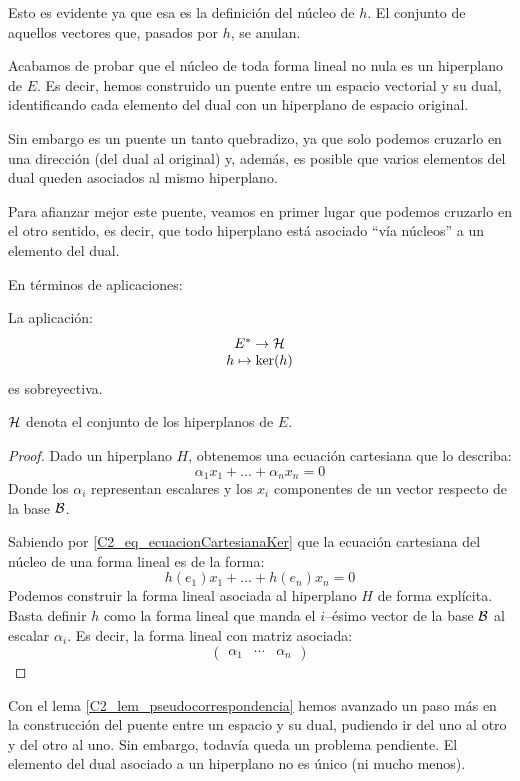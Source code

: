Esto es evidente ya que esa es la definición del núcleo de $h$. El conjunto de aquellos vectores que, pasados por $h$, se anulan.

Acabamos de probar que el núcleo de toda forma lineal no nula es un hiperplano de $E$. Es decir, hemos construido un puente entre un espacio vectorial y su dual, identificando cada elemento del dual con un hiperplano de espacio original.

Sin embargo es un puente un tanto quebradizo, ya que solo podemos cruzarlo en una dirección (del dual al original) y, además, es posible que varios elementos del dual queden asociados al mismo hiperplano.

Para afianzar mejor este puente, veamos en primer lugar que podemos cruzarlo en el otro sentido, es decir, que todo hiperplano está asociado ``vía núcleos'' a un elemento del dual.

En términos de aplicaciones:
\begin{lem}
	\label{C2_lem_pseudocorrespondencia}
	La aplicación:
	\[\begin{array}{c}
	E^*\to\mathcal{H}\\
	h\mapsto \ker(h)
	\end{array}\]
	es sobreyectiva.
	
	$\mathcal{H}$ denota el conjunto de los hiperplanos de $E$.
\end{lem}
\begin{proof}
	Dado un hiperplano $H$, obtenemos una ecuación cartesiana que lo describa:
	\[\alpha_1x_1+\dots+\alpha_nx_n=0\]
	Donde los $\alpha_i$ representan escalares y los $x_i$ componentes de un vector respecto de la base $\mathcal{B}$.
		
	Sabiendo por \eqref{C2_eq_ecuacionCartesianaKer} que la ecuación cartesiana del núcleo de una forma lineal es de la forma:
	\[h(e_1)x_1+\dots+h(e_n)x_n=0\]
	Podemos construir la forma lineal asociada al hiperplano $H$ de forma explícita. Basta definir $h$ como la forma lineal que manda el $i$--ésimo vector de la base $\mathcal{B}$ al escalar $\alpha_i$. Es decir, la forma lineal con matriz asociada:
	\[\begin{pmatrix}
	\alpha_1 & \cdots & \alpha_n
	\end{pmatrix}\]
\end{proof}

Con el lema \ref{C2_lem_pseudocorrespondencia} hemos avanzado un paso más en la construcción del puente entre un espacio y su dual, pudiendo ir del uno al otro y del otro al uno. Sin embargo, todavía queda un problema pendiente. El elemento del dual asociado a un hiperplano no es único (ni mucho menos).

